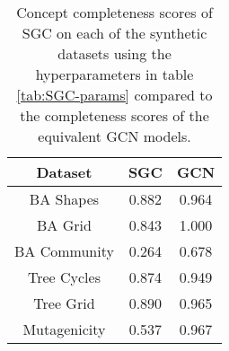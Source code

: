 \begin{table}[h]
    \centering
    \captionsetup{width=.9\textwidth}
    \begin{tabular}{c|c|c}
        \textbf{Dataset} &
        \textbf{SGC} &
        \textbf{GCN} \\
        \midrule
        BA Shapes       & 0.882 & 0.964 \\
        BA Grid         & 0.843 & 1.000 \\
        BA Community    & 0.264 & 0.678 \\
        Tree Cycles     & 0.874 & 0.949 \\
        Tree Grid       & 0.890 & 0.965 \\
        \midrule
        Mutagenicity    & 0.537 & 0.967 \\
    \end{tabular}
    \caption{Concept completeness scores of SGC on each of the synthetic datasets using the hyperparameters in table \ref{tab:SGC-params} compared to the completeness scores of the equivalent GCN models.}
    \label{tab:SGC-completeness}
\end{table}

